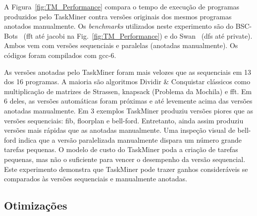 \documentclass[sigplan,10pt,review]{acmart}
\newcommand\Taskminer{\mbox{\textsf{TaskMiner}}}
\begin{document}
A Figura~\ref{fig:TM_Performance} compara o tempo de execução de programas produzidos
pelo {\Taskminer} contra versões originais dos mesmos programas anotados manualmente.
Os {\em benchmarks} utilizados neste experimento são do \textsf{BSC-Bots}~\cite{Duran09} (\textsf{fft} até \textsf{jacobi}
na Fig.~\ref{fig:TM_Performance}) e do \textsf{Swan}~\cite{Moreira17}
(\textsf{dfs} até \textsf{private}).
Ambos vem com versões sequenciais e paralelas (anotadas manualmente). Os códigos foram compilados
com gcc-6.

As versões anotadas pelo \Taskminer{} foram mais velozes que as sequenciais em 13 dos 16 programas.
A maioria são algoritmos Dividir \& Conquistar clássicos como multiplicação de matrizes de \textsf{Strassen},
 \textsf{knapsack} (Problema da Mochila) e \textsf{fft}. Em 6 deles, as versões automáticas foram próximas e até
levemente acima das versões anotadas manualmente. Em 3 exemplos \Taskminer{} produziu versões piores que
as versões sequenciais: \textsf{fib}, \textsf{floorplan} e \textsf{bell-ford}. Entretanto, ainda assim produziu versões
mais rápidas que as anotadas manualmente. Uma inspeção visual de \textsf{bell-ford} indica que a versão
paralelizada manualmente dispara um número grande tarefas pequenas. O modelo de custo
do \Taskminer{} poda a criação de tarefas pequenas, mas não o suficiente para vencer o desempenho
da versão sequencial. Este experimento demonstra que \Taskminer{} pode trazer
ganhos consideráveis se comparados às versões sequenciais e manualmente anotadas.

\subsection{Otimizações}
\label{sub:optimizations}
\end{document}
